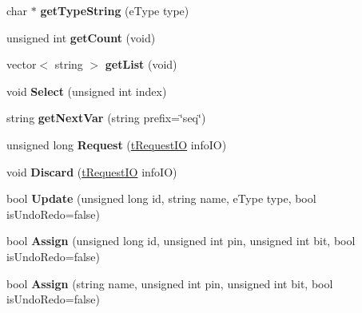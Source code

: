 \begin{DoxyCompactItemize}
\item 
\hypertarget{classmap_i_o_ad1babcce02eb625731ee2e821d26b7a1}{char $\ast$ {\bfseries get\-Type\-String} (e\-Type type)}\label{classmap_i_o_ad1babcce02eb625731ee2e821d26b7a1}

\item 
\hypertarget{classmap_i_o_aa10e526e5d44c256a6390c5dcd0175c0}{unsigned int {\bfseries get\-Count} (void)}\label{classmap_i_o_aa10e526e5d44c256a6390c5dcd0175c0}

\item 
\hypertarget{classmap_i_o_af428be7bed70236514249ac860a93325}{vector$<$ string $>$ {\bfseries get\-List} (void)}\label{classmap_i_o_af428be7bed70236514249ac860a93325}

\item 
\hypertarget{classmap_i_o_af42b9a8dfbff8b80c7c97aee6940cf24}{void {\bfseries Select} (unsigned int index)}\label{classmap_i_o_af42b9a8dfbff8b80c7c97aee6940cf24}

\item 
\hypertarget{classmap_i_o_a0d34391c8434bdca0a8f7406f0d548c5}{string {\bfseries get\-Next\-Var} (string prefix=\char`\"{}seq\char`\"{})}\label{classmap_i_o_a0d34391c8434bdca0a8f7406f0d548c5}

\item 
\hypertarget{classmap_i_o_ab5c4eb63fdedefd4c54db7e6c2319950}{unsigned long {\bfseries Request} (\hyperlink{structt_request_i_o}{t\-Request\-I\-O} info\-I\-O)}\label{classmap_i_o_ab5c4eb63fdedefd4c54db7e6c2319950}

\item 
\hypertarget{classmap_i_o_aad5bdd67eab02f15df3fa583e140b57f}{void {\bfseries Discard} (\hyperlink{structt_request_i_o}{t\-Request\-I\-O} info\-I\-O)}\label{classmap_i_o_aad5bdd67eab02f15df3fa583e140b57f}

\item 
\hypertarget{classmap_i_o_ae5e871db76c6ebba5ca6cee392293c34}{bool {\bfseries Update} (unsigned long id, string name, e\-Type type, bool is\-Undo\-Redo=false)}\label{classmap_i_o_ae5e871db76c6ebba5ca6cee392293c34}

\item 
\hypertarget{classmap_i_o_a57b685acd10a5c5f36b6910596586eec}{bool {\bfseries Assign} (unsigned long id, unsigned int pin, unsigned int bit, bool is\-Undo\-Redo=false)}\label{classmap_i_o_a57b685acd10a5c5f36b6910596586eec}

\item 
\hypertarget{classmap_i_o_a5319a5778e75231d08210b199b670e38}{bool {\bfseries Assign} (string name, unsigned int pin, unsigned int bit, bool is\-Undo\-Redo=false)}\label{classmap_i_o_a5319a5778e75231d08210b199b670e38}


\end{DoxyCompactItemize}
